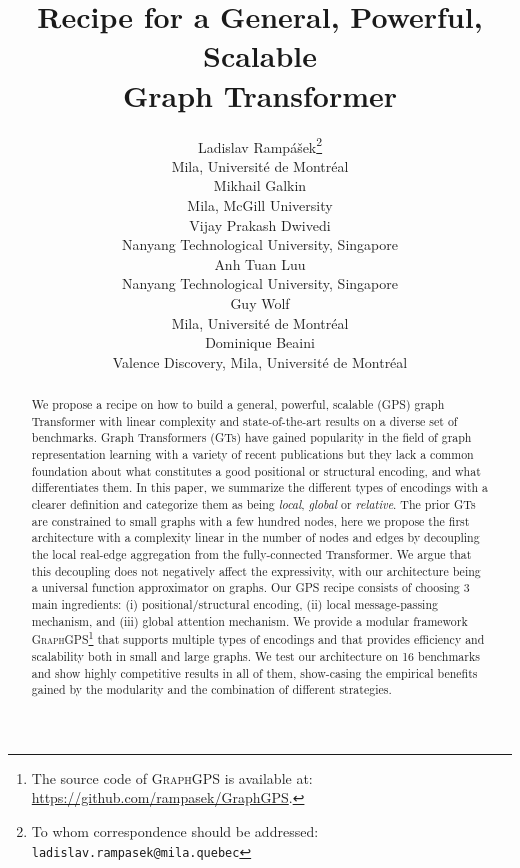 \documentclass{article}
\title{Recipe for a General, Powerful, Scalable\\ Graph Transformer}
\author{Ladislav Rampášek\thanks{To whom correspondence should be addressed: \texttt{ladislav.rampasek@mila.quebec}} \\
   Mila, Université de Montréal \\
\And
   Mikhail Galkin \\
   Mila, McGill University \\
\AND
   Vijay Prakash Dwivedi \\
   Nanyang Technological University, Singapore \\
\And
   Anh Tuan Luu \\
   Nanyang Technological University, Singapore \\
\And
   Guy Wolf \\
   Mila, Université de Montréal \\
\And
   Dominique Beaini \\
   Valence Discovery, Mila, Université de Montréal \\
}
\begin{document}
\newcommand{\mycomment}[3]{\textcolor{#1}{[\textbf{#2:} #3]}}
\newcommand{\lr}[1]{\mycomment{orange}{LR}{#1}}
\newcommand{\db}[1]{\mycomment{magenta}{DB}{#1}}
\newcommand{\mg}[1]{\mycomment{green!70!black}{MG}{#1}}
\newcommand{\draft}[1]{\textcolor{blue}{#1}}
\newcommand{\vd}[1]{\textcolor{purpleheart}{#1}} 

\newcommand{\myparagraph}[1]{\noindent\textbf{#1}}



\newcommand{\first}[1]{\textbf{\textcolor{dark2green}{#1}}}
\newcommand{\second}[1]{\textbf{\textcolor{dark2orange}{#1}}}
\newcommand{\third}[1]{\textbf{\textcolor{dark2purple}{#1}}}

\newcommand{\method}{GPS\xspace}
\newcommand{\gtgym}{\textsc{GraphGPS}\xspace}

\newcommand{\PE}{\textcolor{pe_color}{PE}\xspace}
\newcommand{\SE}{\textcolor{se_color}{SE}\xspace}


\maketitle
\setcounter{footnote}{0}

\begin{abstract}
We propose a recipe on how to build a general, powerful, scalable (GPS) graph Transformer with linear complexity and state-of-the-art results on a diverse set of benchmarks.
Graph Transformers (GTs) have gained popularity in the field of graph representation learning with a variety of recent publications but they lack a common foundation about what constitutes a good positional or structural encoding, and what differentiates them. In this paper, we summarize the different types of encodings with a clearer definition and categorize them as being \textit{local}, \textit{global} or \textit{relative}.
The prior GTs are constrained to small graphs with a few hundred nodes, here we propose the first architecture with a complexity linear in the number of nodes and edges  by decoupling the local real-edge aggregation from the fully-connected Transformer. We argue that this decoupling does not negatively affect the expressivity, with our architecture being a universal function approximator on graphs. Our GPS recipe consists of choosing 3 main ingredients: (i) positional/structural encoding, (ii) local message-passing mechanism, and (iii) global attention mechanism.
We provide a modular framework \textsc{GraphGPS}\footnote{The source code of \textsc{GraphGPS} is available at: \url{https://github.com/rampasek/GraphGPS}.}
that supports multiple types of encodings and that provides efficiency and scalability both in small and large graphs.
We test our architecture on 16 benchmarks and show highly competitive results in all of them, show-casing the empirical benefits gained by the modularity and the combination of different strategies.
\end{abstract}
\end{document}
